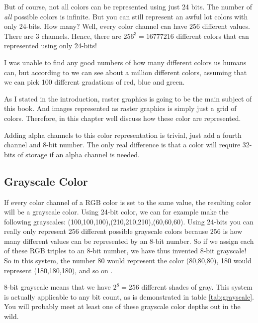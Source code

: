 But of course, not all colors can be represented using just
24 bits. The number of \textit{all} possible colors is infinite. But you can still
represent an awful lot colors with only 24-bits. How many? Well, every
color channel can have $256$ different values. There are $3$
channels. Hence, there are $256^3 = 16777216$ different colors that
can represented using only 24-bits!

I was unable to find any good numbers of how many different colors us
humans can, but according to \cite{roth:_tetrachromat} we can see
about a million different colors, assuming  that we can pick 100
different gradations of red, blue and green.

As I stated in the introduction, raster graphics is going to be the
main subject of this book. And images represented as raster graphics
is simply just a grid of colors. Therefore, in this chapter well
discuss how these color are represented.


\newcommand{\rgbaquad}[4]{
  \mbox{(\textcolor{red}{#1},\textcolor{green}{#2},\textcolor{blue}{#3},\textcolor{gray}{#4})}}

Adding alpha channels to this color representation is trivial, just
add a fourth channel and 8-bit number. The only real
difference is that a color will require 32-bits of storage if an
alpha channel is needed.

\subsection{Grayscale Color}

\newcommand{\selfrgbtrip}[3]{\mbox{\textcolor[RGB]{#1,#2,#3}{(#1,#2,#3)}}}
\newcommand{\selfrgbtripgray}[1]{\selfrgbtrip{#1}{#1}{#1}}

If every color channel of a RGB color is set to the same value, the
resulting color will be a grayscale color. Using 24-bit color, we can for example make the following
grayscales:
\selfrgbtripgray{100},\selfrgbtripgray{210},\selfrgbtripgray{60}. Using
24-bits you can really only represent 256 different possible
grayscale colors because $256$ is how many different values can be
represented by an 8-bit number. So if we assign each of these RGB
triples to an 8-bit number, we have thus invented 8-bit
grayscale! So in this system, the number 80
would represent the color \selfrgbtripgray{80}, 180 would represent
\selfrgbtripgray{180}, and so on \cite{puglia00:_handbook_dig_proj}.

8-bit grayscale means that we have $2^8=256$ different shades of
gray. This system is actually applicable to any bit count, as is
demonstrated in table \ref{tab:grayscale}. You will probably meet at least one of
these grayscale color depths out in the wild.

